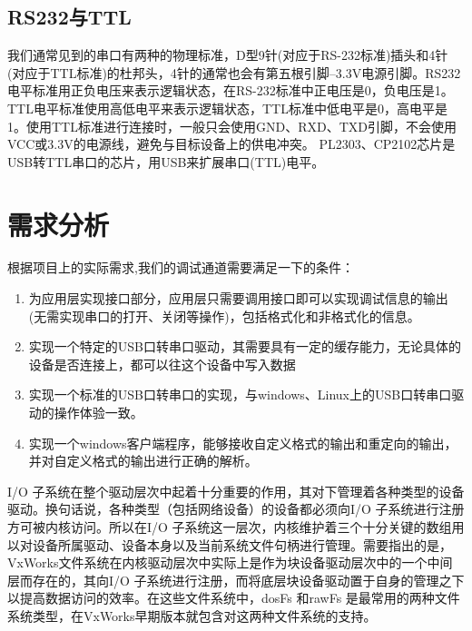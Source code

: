 \subsection{RS232与TTL}
	我们通常见到的串口有两种的物理标准，D型9针(对应于RS-232标准)插头和4针(对应于TTL标准)的杜邦头，4针的通常也会有第五根引脚--3.3V电源引脚。RS232电平标准用正负电压来表示逻辑状态，在RS-232标准中正电压是0，负电压是1。TTL电平标准使用高低电平来表示逻辑状态，TTL标准中低电平是0，高电平是1。使用TTL标准进行连接时，一般只会使用GND、RXD、TXD引脚，不会使用VCC或3.3V的电源线，避免与目标设备上的供电冲突。
	PL2303、CP2102芯片是USB转TTL串口的芯片，用USB来扩展串口(TTL)电平。	
 










\section{需求分析}
	根据项目上的实际需求,我们的调试通道需要满足一下的条件：
\begin{enumerate}
\item 为应用层实现接口部分，应用层只需要调用接口即可以实现调试信息的输出(无需实现串口的打开、关闭等操作)，包括格式化和非格式化的信息。 

\item 实现一个特定的USB口转串口驱动，其需要具有一定的缓存能力，无论具体的设备是否连接上，都可以往这个设备中写入数据

\item 实现一个标准的USB口转串口的实现，与windows、Linux上的USB口转串口驱动的操作体验一致。

\item 实现一个windows客户端程序，能够接收自定义格式的输出和重定向的输出，并对自定义格式的输出进行正确的解析。
\end{enumerate}















	I/O 子系统在整个驱动层次中起着十分重要的作用，其对下管理着各种类型的设备驱动。换句话说，各种类型（包括网络设备）的设备都必须向I/O 子系统进行注册方可被内核访问。所以在I/O 子系统这一层次，内核维护着三个十分关键的数组用以对设备所属驱动、设备本身以及当前系统文件句柄进行管理。需要指出的是，VxWorks文件系统在内核驱动层次中实际上是作为块设备驱动层次中的一个中间层而存在的，其向I/O 子系统进行注册，而将底层块设备驱动置于自身的管理之下以提高数据访问的效率。在这些文件系统中，dosFs 和rawFs 是最常用的两种文件系统类型，在VxWorks早期版本就包含对这两种文件系统的支持。


















